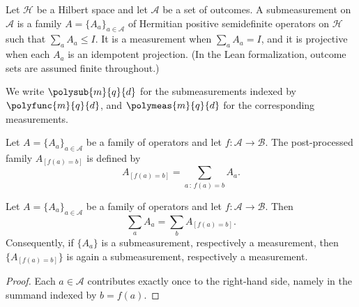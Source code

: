 \begin{definition}\label{def:submeasurement}
	\leanok
	Let $\mathcal H$ be a Hilbert space and let $\mathcal A$ be a set of outcomes. A submeasurement on $\mathcal A$ is a family $A=\{A_a\}_{a \in \mathcal A}$ of Hermitian positive semidefinite operators on $\mathcal H$ such that $\sum_a A_a \le I$. It is a measurement when $\sum_a A_a = I$, and it is projective when each $A_a$ is an idempotent projection. (In the Lean formalization, outcome sets are assumed finite throughout.)
\end{definition}

\begin{definition}\label{def:polymeasurements}
	\leanok
	We write $\polysub{m}{q}{d}$ for the submeasurements indexed by $\polyfunc{m}{q}{d}$, and $\polymeas{m}{q}{d}$ for the corresponding measurements.
\end{definition}

\begin{definition}\label{def:post-processing}
	\leanok
	Let $A=\{A_a\}_{a \in \mathcal A}$ be a family of operators and let $f\colon \mathcal A \to \mathcal B$. The post-processed family $A_{[f(a)=b]}$ is defined by
	\[
		A_{[f(a)=b]} = \sum_{a\, :\, f(a)=b} A_a.
	\]
\end{definition}

\begin{proposition}\label{prop:post-processing-preserves}
	\leanok
	Let $A=\{A_a\}_{a \in \mathcal A}$ be a family of operators and let
	$f\colon \mathcal A \to \mathcal B$. Then
	\[
		\sum_a A_a = \sum_b A_{[f(a)=b]}.
	\]
	Consequently, if $\{A_a\}$ is a submeasurement, respectively a measurement, then
	$\{A_{[f(a)=b]}\}$ is again a submeasurement, respectively a measurement.
\end{proposition}
\begin{proof}
	\leanok
	Each $a \in \mathcal A$ contributes exactly once to the right-hand side, namely in
	the summand indexed by $b=f(a)$.
\end{proof}

